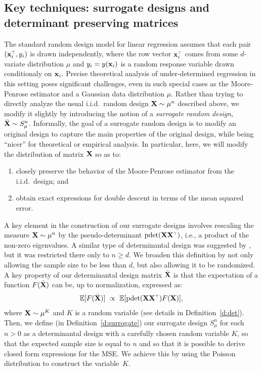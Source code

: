 \documentclass[11pt]{article}
\begin{document}
\subsection{Key techniques: surrogate designs and
  determinant preserving matrices}

The standard random design model for linear regression assumes that
each pair $(\x_i^\top,y_i)$ is drawn independently, where the row vector
$\x_i^\top$ comes from some $d$-variate distribution $\mu$ and $y_i=y(\mathbf x_i)$ is a random response variable drawn conditionaly on $\mathbf x_i$.
Precise theoretical analysis of under-determined regression in this
setting poses significant challenges, even in such special cases as
the Moore-Penrose estimator and a Gaussian data distribution $\mu$.
Rather than trying to directly analyze the usual i.i.d.~random design
$\mathbf X\sim\mu^n$ described above, we modify it slightly by introducing
the notion of a \emph{surrogate random design}, ${\bar{\mathbf X}}\sim S_\mu^n$.
Informally, the goal of a surrogate random design is to modify an
original design to capture the main properties of the original design,
while being ``nicer'' for theoretical or empirical analysis.
In particular, here, we will modify the distribution of matrix $\mathbf X$ so
as to:
\begin{enumerate}
  \item closely preserve the behavior of the Moore-Penrose estimator
from the i.i.d.~design; and
  \item obtain exact expressions for double descent in terms of the
    mean squared error.
\end{enumerate}
A key element in the construction of our surrogate designs involves rescaling the measure $\mathbf X\sim\mu^n$ by the pseudo-determinant $\pdet(\X\X^\top)$, i.e., a product of the non-zero eigenvalues.
A similar type of determinantal design was suggested by
\cite{correcting-bias-journal}, but it was restricted there only to
$n\geq d$.
We broaden this definition by not only allowing the sample size to be
less than $d$, but also allowing it to be randomized.
A key property of our determinantal design matrix ${\bar{\mathbf X}}$ is that
the expectation of a function $F({\bar{\mathbf X}})$ can be, up to normalization,
expressed as:
\begin{align*}
  \E[F(\Xb)]\ \propto\ \E[\pdet(\X\X^\top)F(\X)],
  \end{align*}
where $\mathbf X\sim\mu^K$ and $K$ is a random variable (see details in Definition~\ref{d:det}).
Then, we define (in Definition~\ref{d:surrogate}) our surrogate design $S_\mu^n$ for each $n>0$ as a determinantal design with a carefully chosen random variable $K$, so that the expected sample size is equal to $n$ and so that it is possible to derive closed form expressions for the MSE.
We achieve this by using the Poisson distribution to construct the variable~$K$.
\end{document}
